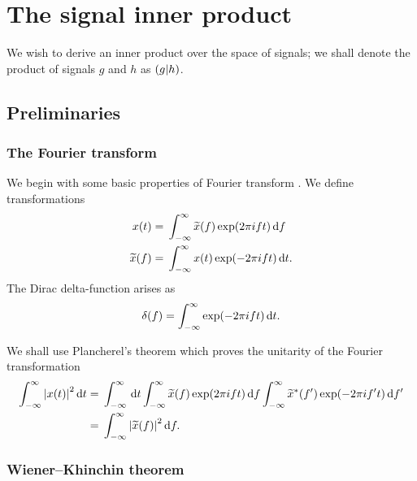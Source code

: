 \chapter{The signal inner product}\label{ap:inner-prod}

We wish to derive an inner product over the space of signals; we shall denote the product of signals $g$ and $h$ as $\left({g}\middle|{h}\right)$.

\section{Preliminaries}

\subsection{The Fourier transform}

We begin with some basic properties of Fourier transform \citep[section 13.1]{Riley2002}. We define transformations
\begin{subequations}
\begin{align}
x(t) = {} & \int_{-\infty}^{\infty}{\widetilde{x}(f)\exp(2\pi ift)}\,\mathrm{d}{f} \\
\widetilde{x}(f) = {} & \int_{-\infty}^{\infty}{x(t)\exp(-2\pi ift)}\,\mathrm{d}{t}.
\end{align}
\end{subequations}
The Dirac delta-function arises as
\begin{equation}
\delta(f) = \int_{-\infty}^{\infty}{\exp(-2\pi ift)}\,\mathrm{d}{t}.
\end{equation}

We shall use Plancherel's theorem which proves the unitarity of the Fourier transformation
\begin{align}
\int_{-\infty}^{\infty}{\left|x(t)\right|^2}\,\mathrm{d}{t} = {} & \int_{-\infty}^\infty\,\mathrm{d} t \int_{-\infty}^{\infty}{\widetilde{x}(f)\exp(2\pi ift)}\,\mathrm{d}{f} \int_{-\infty}^{\infty}{\widetilde{x}^\ast(f')\exp(-2\pi if't)}\,\mathrm{d}{f'} \nonumber \\
 = {} & \int_{-\infty}^{\infty}{\left|\widetilde{x}(f)\right|^2}\,\mathrm{d}{f}.
\end{align}

\subsection{Wiener--Khinchin theorem}

